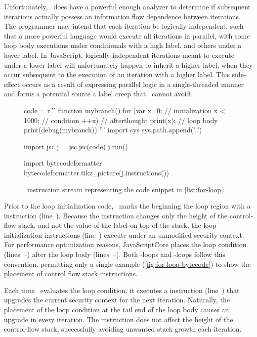 Unfortunately, \FlowCore\ does have a powerful enough analyzer to determine if subsequent iterations actually possess an information flow dependence between iterations.
The programmer may intend that each iteration be logically independent, such that a more powerful language would execute all iterations in parallel, with some loop body executions under conditionals with a high label, and others under a lower label.
In JavaScript, logically-independent iterations meant to execute under a lower label will unfortunately happen to inherit a higher label, when they occur subsequent to the execution of an iteration with a higher label.
This side-effect occurs as a result of expressing parallel logic in a single-threaded manner and forms a potential source a label creep that \FlowCore\ cannot avoid.

\begin{figure}[h]
\begin{python}
code = r'''
function mybranch() {
  for (var x=0;      // initialization
       x < 1000;     // condition
       ++x) {        // afterthought
    print(x);        // loop body
  }
}
print(debug(mybranch))
'''
import sys
sys.path.append('..')

import jsc
j = jsc.jsc(code)
j.run()

import bytecodeformatter
bytecodeformatter.tikz_picture(j.instructions())
\end{python}
  \caption{\FlowCore\ instruction stream representing the code snippet in \autoref{list:for-loop}.}
  \label{fig:for-loop-bytecode}
\end{figure}

Prior to the loop initialization code, \FlowCore\ marks the beginning the loop region with a \dup instruction (line~).
Because the \dup instruction changes only the height of the control-flow stack, and not the value of the label on top of the stack, the loop initialization instructions (line~) execute under an unmodified security context.
For performance optimization reasons, JavaScriptCore places the loop condition (lines~--) after the loop body (lines~--).
Both -loops and -loops follow this convention, permitting only a single example (\autoref{fig:for-loop-bytecode}) to show the placement of control flow stack instructions.

Each time \FlowCore\ evaluates the loop condition, it executes a \join instruction (line~) that upgrades the current security context for the next iteration.
Naturally, the placement of the loop condition at the tail end of the loop body causes an upgrade in every iteration.
The \join instruction does not affect the height of the control-flow stack, successfully avoiding unwanted stack growth each iteration.

